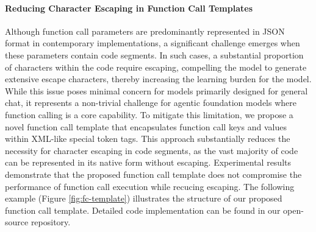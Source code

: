 \documentclass{article}
\theoremstyle{definition}
\begin{document}
\paragraph{Reducing Character Escaping in Function Call Templates} Although function call parameters are predominantly represented in JSON format in contemporary implementations, a significant challenge emerges when these parameters contain code segments. In such cases, a substantial proportion of characters within the code require escaping, compelling the model to generate extensive escape characters, thereby increasing the learning burden for the model. While this issue poses minimal concern for models primarily designed for general chat, it represents a non-trivial challenge for agentic foundation models where function calling is a core capability.
To mitigate this limitation, we propose a novel function call template that encapsulates function call keys and values within XML-like special token tags. This approach substantially reduces the necessity for character escaping in code segments, as the vast majority of code can be represented in its native form without escaping. Experimental results demonstrate that the proposed function call template does not compromise the performance of function call execution while recucing escaping. The following example (Figure \ref{fig:fc-template}) illustrates the structure of our proposed function call template. Detailed code implementation can be found in our open-source repository.
\end{document}
